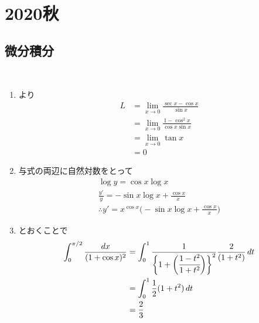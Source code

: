 \section{2020秋}

\setcounter{yearcounter}{2020}


\subsection{微分積分}
\begin{ans*}
  ${}$
  \begin{enumerate}[label=(\alph*)]
    \item {}より
    \begin{align}
      L
      &= \lim_{x\to 0}\frac{\sec x - \cos x}{\sin x} \\
      &= \lim_{x\to 0}\frac{1-\cos^2 x}{\cos x \sin x} \\
      &= \lim_{x\to 0}\tan x \\
      &= 0
    \end{align}
    \item 与式の両辺に自然対数をとって
    \begin{gather}
      \log y = \cos x \log x \\
      \frac{y'}{y} = -\sin x \log x + \frac{\cos x}{x} \\
      \therefore y' = x^{\cos x}\biggl(-\sin x \log x + \frac{\cos x}{x}\biggr)
    \end{gather}
    \item {}とおくことで
    \begin{align}
      \int_{0}^{\pi/2} \frac{dx}{(1+\cos x)^2}
      &= \int_{0}^{1}\frac{1}{\biggl\{ 1+\biggl(\cfrac{1-t^2}{1+t^2}\biggr) \biggr\}^2}\frac{2}{(1+t^2)}\,dt \\
      &= \int_{0}^{1}\frac{1}{2}(1+t^2)\,dt \\
      &= \frac{2}{3}
    \end{align}
  \end{enumerate}
\end{ans*}

